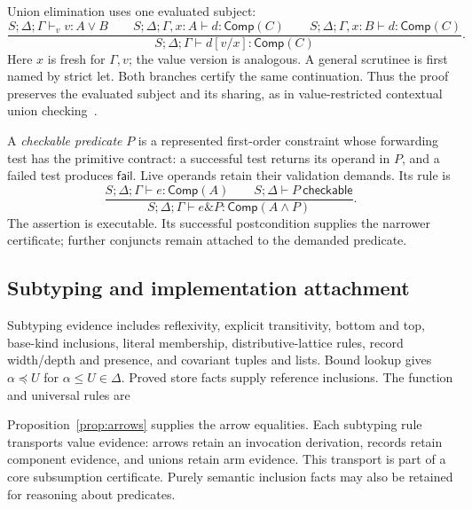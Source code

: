 \documentclass[10pt,a4paper]{article}
\newcommand{\supp}{\operatorname{supp}}
\newcommand{\Comp}{\mathsf{Comp}}
\newcommand{\Fail}{\mathsf{fail}}
\newcommand{\jud}{S;\Delta;\Gamma}
\theoremstyle{remark}
\begin{document}
Union elimination uses one evaluated subject:
\begin{equation}\label{eq:union-cut}
 \frac{\jud\vdash_v v:A\lor B\qquad
       S;\Delta;\Gamma,x:A\vdash d:\Comp(C)\qquad
       S;\Delta;\Gamma,x:B\vdash d:\Comp(C)}
      {\jud\vdash d[v/x]:\Comp(C)}.
\end{equation}
Here $x$ is fresh for $\Gamma,v$; the value version is analogous. A general
scrutinee is first named by strict let. Both branches certify the same
continuation. Thus the proof preserves the evaluated subject and its sharing,
as in value-restricted contextual union checking~\cite{unions}.

A \emph{checkable predicate} $P$ is a represented first-order constraint whose
forwarding test has the primitive contract: a successful test returns its
operand in $P$, and a failed test produces $\Fail$. Live operands retain their
validation demands. Its rule is
\begin{equation}\label{eq:assertion}
 \frac{\jud\vdash e:\Comp(A)\qquad S;\Delta\vdash P\ \mathsf{checkable}}
      {\jud\vdash e\mathbin{\&}P:\Comp(A\land P)}.
\end{equation}
The assertion is executable. Its successful postcondition supplies the narrower
certificate; further conjuncts remain attached to the demanded predicate.

\subsection{Subtyping and implementation attachment}
Subtyping evidence includes reflexivity, explicit transitivity, bottom and top,
base-kind inclusions, literal membership, distributive-lattice rules, record
width/depth and presence, and covariant tuples and lists. Bound lookup gives
$\alpha\preceq U$ for $\alpha\le U\in\Delta$. Proved store facts supply
reference inclusions. The function and universal rules are
Proposition~\ref{prop:arrows} supplies the arrow equalities. Each subtyping
rule transports value evidence: arrows retain an invocation derivation, records
retain component evidence, and unions retain arm evidence. This transport is
part of a core subsumption certificate. Purely semantic inclusion facts may
also be retained for reasoning about predicates.
\end{document}
